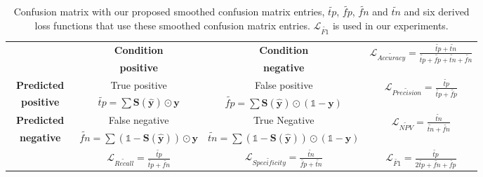 \begin{table}[]
\caption{Confusion matrix with our proposed smoothed confusion matrix entries, $\widetilde{\mathit{tp}}$, $\widetilde{\mathit{fp}}$, $\widetilde{\mathit{fn}}$ and $\widetilde{\mathit{tn}}$ and six derived loss functions that use these smoothed confusion matrix entries. $\mathcal{L}_{\widetilde{\mathit{F1}}}$ is used in our experiments.}
\label{tab:confusion-matrix}
\def\arraystretch{1.1}
\begin{tabular}{|c||c|c||c|} \cline{2-4}
\multicolumn{1}{l|}{} & \textbf{Condition} & \textbf{Condition} & \multirow{2}{*}{$\mathcal{L}_{\widetilde{\mathit{Accuracy}}}= \frac{\widetilde{\mathit{tp}} + \widetilde{\mathit{tn}}}{\widetilde{\mathit{tp}} + \widetilde{\mathit{fp}} + \widetilde{\mathit{tn}} + \widetilde{\mathit{fn}}}$} \\
\multicolumn{1}{l|}{} & \textbf{positive} &  \textbf{negative} & \\ \hline \hline
\textbf{~Predicted~} & True positive & False positive & \multirow{2}{*}{$\mathcal{L}_{\widetilde{\mathit{Precision}}}= \frac{\widetilde{\mathit{tp}}}{\widetilde{\mathit{tp}} + \widetilde{\mathit{fp}}}$} \\
\textbf{positive} & $\widetilde{\mathit{tp}}=\sum \mathbf{S}(\hat{\mathbf{y}}) \odot \mathbf{y}$ & $\widetilde{\mathit{fp}}= \sum \mathbf{S}(\hat{\mathbf{y}}) \odot (\mathds{1} - \mathbf{y})$ & \\ \hline
\textbf{Predicted} & False negative & True Negative & \multirow{2}{*}{$\mathcal{L}_{\widetilde{\mathit{NPV}}}= \frac{\widetilde{\mathit{tn}}}{\widetilde{\mathit{tn}} + \widetilde{\mathit{fn}}}$} \\
\textbf{negative} & $\widetilde{\mathit{fn}}= \sum (\mathds{1} - \mathbf{S}(\hat{\mathbf{y}})) \odot \mathbf{y}$ & $\widetilde{\mathit{tn}}= \sum (\mathds{1} - \mathbf{S}(\hat{\mathbf{y}})) \odot (\mathds{1} - \mathbf{y})$ & \\ \hline \hline
\multicolumn{1}{l|}{} & \multirow{2}{*}{\hspace{1.2em}$\mathcal{L}_{\widetilde{\mathit{Recall}}}= \frac{\widetilde{\mathit{tp}}}{\widetilde{\mathit{tp}} + \widetilde{\mathit{fn}}}$\hspace{1.2em}}& \multirow{2}{*}{$\mathcal{L}_{\widetilde{\mathit{Specificity}}}= \frac{\widetilde{\mathit{tn}}}{\widetilde{\mathit{fp}} + \widetilde{\mathit{tn}}}$} & \multirow{2}{*}{$\mathcal{L}_{\widetilde{\mathit{F1}}}= \frac{\widetilde{\mathit{tp}}}{2 \widetilde{\mathit{tp}}+ \widetilde{\mathit{fn}}+ \widetilde{\mathit{fp}}}$} \\
\multicolumn{1}{l|}{} & & & \\
\cline{2-4}
\end{tabular}%
\end{table}

